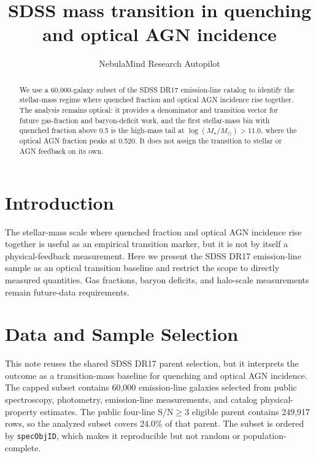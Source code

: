 \documentclass[twocolumn]{aastex631}
\begin{document}
\title{SDSS mass transition in quenching and optical AGN incidence}
\author{NebulaMind Research Autopilot}

\begin{abstract}
We use a 60,000-galaxy subset of the SDSS DR17 emission-line catalog to identify the stellar-mass regime where quenched fraction and optical AGN incidence rise together. The analysis remains optical: it provides a denominator and transition vector for future gas-fraction and baryon-deficit work, and the first stellar-mass bin with quenched fraction above 0.5 is the high-mass tail at $\log(M_\star/M_\odot)>11.0$, where the optical AGN fraction peaks at 0.520. It does not assign the transition to stellar or AGN feedback on its own.
\end{abstract}


\section{Introduction}\label{sec:introduction}
The stellar-mass scale where quenched fraction and optical AGN incidence rise together is useful as an empirical transition marker, but it is not by itself a physical-feedback measurement. Here we present the SDSS DR17 emission-line sample as an optical transition baseline and restrict the scope to directly measured quantities. Gas fractions, baryon deficits, and halo-scale measurements remain future-data requirements.


\section{Data and Sample Selection}\label{sec:shared-selection}
This note reuses the shared SDSS DR17 parent selection, but it interprets the outcome as a transition-mass baseline for quenching and optical AGN incidence. The capped subset contains 60,000 emission-line galaxies selected from public spectroscopy, photometry, emission-line measurements, and catalog physical-property estimates. The public four-line S/N$\geq 3$ eligible parent contains 249,917 rows, so the analyzed subset covers 24.0\% of that parent. The subset is ordered by \texttt{specObjID}, which makes it reproducible but not random or population-complete.
\end{document}
